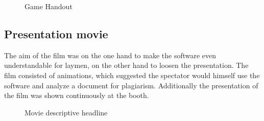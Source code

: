\begin{figure}[!h]
  \centering
  \caption{Game Handout}
  \label{fig:game-handout}
\end{figure}



\subsection{Presentation movie}
The aim of the film was on the one hand to make the software even understandable for laymen, on the other hand to loosen the presentation. The film consisted of animations, which suggested the spectator would himself use the software and analyze a document for plagiarism. Additionally the presentation of the film was shown continuously at the booth.

\begin{figure}[!h]
  \centering
  \caption{Movie descriptive headline}
  \label{fig:descriptive-headline}
\end{figure}


\pagebreak 


